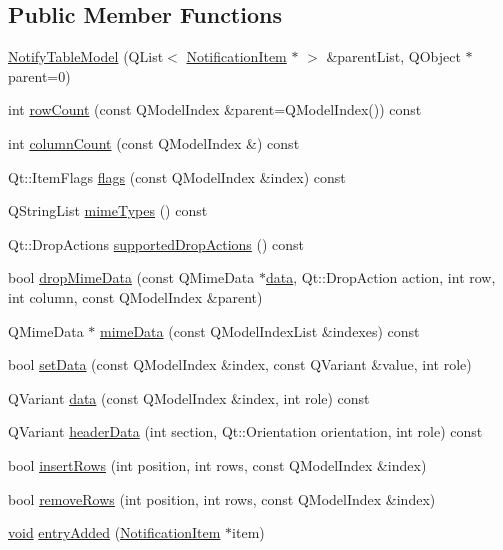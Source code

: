 \subsection*{\-Public \-Member \-Functions}
\begin{DoxyCompactItemize}
\item 
\hyperlink{group___notify_plugin_ga7c99d26f6ccdab1cb80b8cfdfaa9d814}{\-Notify\-Table\-Model} (\-Q\-List$<$ \hyperlink{class_notification_item}{\-Notification\-Item} $\ast$ $>$ \&parent\-List, \-Q\-Object $\ast$parent=0)
\item 
int \hyperlink{group___notify_plugin_ga2bd35c3c39b4a7c057e00786a7ece129}{row\-Count} (const \-Q\-Model\-Index \&parent=\-Q\-Model\-Index()) const 
\item 
int \hyperlink{group___notify_plugin_gaf90f7b29e6b11f9e569df9adf0c0f01f}{column\-Count} (const \-Q\-Model\-Index \&) const 
\item 
\-Qt\-::\-Item\-Flags \hyperlink{group___notify_plugin_ga19b5a3d99feb4907b2332962b1468b9f}{flags} (const \-Q\-Model\-Index \&index) const 
\item 
\-Q\-String\-List \hyperlink{group___notify_plugin_ga8f52bed133220f83210db9d483d6aa26}{mime\-Types} () const 
\item 
\-Qt\-::\-Drop\-Actions \hyperlink{group___notify_plugin_gac83d6e04277e98b87cb42b0ab9b3c9be}{supported\-Drop\-Actions} () const 
\item 
bool \hyperlink{group___notify_plugin_ga623fe8a3346c4c0565352170fc44c4a9}{drop\-Mime\-Data} (const \-Q\-Mime\-Data $\ast$\hyperlink{group___notify_plugin_gacf622323e5cab0f1ecdeb6d35e4b8039}{data}, \-Qt\-::\-Drop\-Action action, int row, int column, const \-Q\-Model\-Index \&parent)
\item 
\-Q\-Mime\-Data $\ast$ \hyperlink{group___notify_plugin_gad898510a85b3055557ed33dc8e319b51}{mime\-Data} (const \-Q\-Model\-Index\-List \&indexes) const 
\item 
bool \hyperlink{group___notify_plugin_gafd2c78e02d0c8123cc83714a3a5ce595}{set\-Data} (const \-Q\-Model\-Index \&index, const \-Q\-Variant \&value, int role)
\item 
\-Q\-Variant \hyperlink{group___notify_plugin_gacf622323e5cab0f1ecdeb6d35e4b8039}{data} (const \-Q\-Model\-Index \&index, int role) const 
\item 
\-Q\-Variant \hyperlink{group___notify_plugin_gab211bb28323ebcede08ef838bc6b2789}{header\-Data} (int section, \-Qt\-::\-Orientation orientation, int role) const 
\item 
bool \hyperlink{group___notify_plugin_ga989fe66cec593e3ae8a3715160d4db33}{insert\-Rows} (int position, int rows, const \-Q\-Model\-Index \&index)
\item 
bool \hyperlink{group___notify_plugin_ga3e038f81c56a42999341a5704f703dd3}{remove\-Rows} (int position, int rows, const \-Q\-Model\-Index \&index)
\item 
\hyperlink{group___u_a_v_objects_plugin_ga444cf2ff3f0ecbe028adce838d373f5c}{void} \hyperlink{group___notify_plugin_gaa28f89364ed3f06a9e1ab36b51216b65}{entry\-Added} (\hyperlink{class_notification_item}{\-Notification\-Item} $\ast$item)
\end{DoxyCompactItemize}


